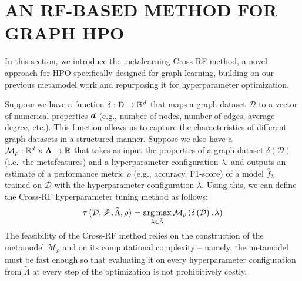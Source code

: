 \section{\uppercase{An RF-based Method for Graph HPO}}
\label{sec:cross-rf}

In this section, we introduce the metalearning Cross-RF method, a novel approach for HPO specifically designed for graph learning, building on our previous metamodel work \cite{prochazka_which_2023} and repurposing it for hyperparameter optimization.

Suppose we have a  function \( \delta : \mathrm{D} \to \mathbb{R}^d \) that maps a graph dataset \( \mathcal{D} \) to a vector of numerical properties \( \boldsymbol{d} \) (e.g., number of nodes, number of edges, average degree, etc.). This function allows us to capture the characteristics of different graph datasets in a structured manner. Suppose we also have a  \( \mathcal{M}_\rho : \mathbb{R}^d \times \boldsymbol\Lambda \to \mathbb{R} \) that takes as input the properties of a graph dataset \( \delta \left( \mathcal{D} \right) \) (i.e.\ the metafeatures) and a hyperparameter configuration \( \lambda \), and outputs an estimate of a performance metric \( \rho \) (e.g., accuracy, F1-score) of a model \( \hat{f}_\lambda \) trained on \( \mathcal{D} \) with the hyperparameter configuration \( \lambda \). Using this, we can define the Cross-RF hyperparameter tuning method as follows:
\begin{equation*}
	\tau \left( \mathcal{D}, \mathscr{F}, \tilde{\Lambda}, \rho \right) = \operatorname*{arg\,max}_{\lambda \in \tilde{\Lambda}} \mathcal{M}_\rho \left( \delta \left( \mathcal{D} \right), \lambda \right)
\end{equation*}
The feasibility of the Cross-RF method relies on the construction of the metamodel \( \mathcal{M}_\rho \) and on its computational complexity -- namely, the metamodel must be fast enough so that evaluating it on every hyperparameter configuration from \( \tilde{\Lambda} \) at every step of the optimization is not prohibitively costly.

